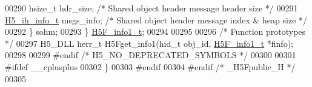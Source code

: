 \begin{DoxyCode}
00290     hsize\_t     hdr\_size;       \textcolor{comment}{/* Shared object header message header size */}
00291     \hyperlink{struct_h5__ih__info__t}{H5\_ih\_info\_t}    msgs\_info;      \textcolor{comment}{/* Shared object header message index & heap size */}
00292     \} sohm;
00293 \} \hyperlink{struct_h5_f__info1__t}{H5F\_info1\_t};
00294 
00295 
00296 \textcolor{comment}{/* Function prototypes */}
00297 H5\_DLL herr\_t H5Fget\_info1(hid\_t obj\_id, \hyperlink{struct_h5_f__info1__t}{H5F\_info1\_t} *finfo);
00298 
00299 \textcolor{preprocessor}{#endif }\textcolor{comment}{/* H5\_NO\_DEPRECATED\_SYMBOLS */}\textcolor{preprocessor}{}
00300 
00301 \textcolor{preprocessor}{#ifdef \_\_cplusplus}
00302 \}
00303 \textcolor{preprocessor}{#endif}
00304 \textcolor{preprocessor}{#endif }\textcolor{comment}{/* \_H5Fpublic\_H */}\textcolor{preprocessor}{}
00305 
\end{DoxyCode}
